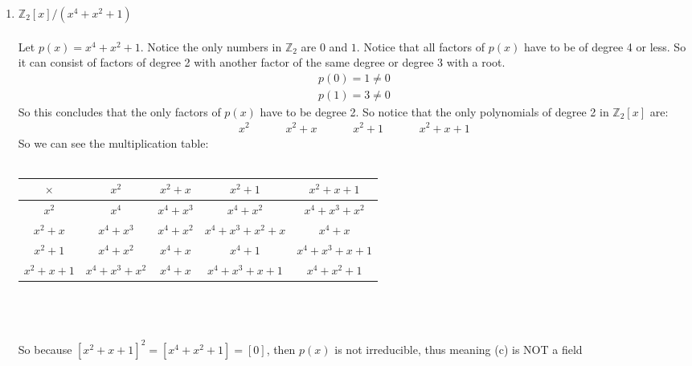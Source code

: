 \documentclass[12pt]{article}
\begin{document}
\begin{enumerate}[label = (\alph*)]
		\item $\mathbb{Z}_2[x]/(x^4  + x^2 + 1)$
		\\ \\
		Let $p(x) = x^4  + x^2 + 1$.  Notice the only numbers in $\mathbb{Z}_2$ are $0$ and $1$. Notice that all factors of $p(x)$ have to be of degree 4 or less.  So it can consist of factors of degree 2 with another factor of the same degree or degree 3 with a root.   
			\begin{align*}
				p(0) = 1 \not = 0 \\
				p(1) = 3 \not = 0 
			\end{align*}
		So this concludes that the only factors of $p(x)$ have to be degree 2. So notice that the only polynomials of degree 2 in $\mathbb{Z}_2[x]$ are:
			\begin{align*}
				x^2 &&&& x^2 + x &&&& x^2 + 1 &&&& x^2 + x + 1
			\end{align*}
		So we can see the multiplication table: \\ \\
			\begin{tabular}{c | c c c c}
				$\times$ & $x^2$ & $x^2 + x$ & $x^2 + 1$ & $x^2 + x + 1$  \\
				\hline
				$x^2$ & $x^4$ & $x^4 + x^3$ & $x^4 + x^2$ & $x^4 + x^3 + x^2$ \\
				$x^2 + x$ & $x^4 + x^3$ & $x^4  + x^2$ & $x^4 + x^3 + x^2 + x$ & $x^4  + x$ \\
				$x^2 + 1$ & $x^4 + x^2$ & $x^4 + x$ & $x^4 + 1$ & $x^4 + x^3 + x + 1$ \\
				$x^2 + x + 1$ & $x^4 + x^3 + x^2$ & $x^4 + x$ & $x^4 + x^3 + x + 1$ & $x^4 + x^2  + 1$
			\end{tabular}
		\\ \\ \\
		So because $[x^2 + x + 1]^2 = [x^4 + x^2  + 1] = [0]$, then $p(x)$ is not irreducible, thus meaning (c) is NOT a field
	\end{enumerate}


\newpage 
\end{document}
